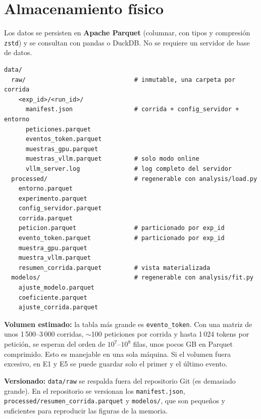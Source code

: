 \documentclass[11pt,a4paper]{article}
\begin{document}
\section{Almacenamiento físico}
Los datos se persisten en \textbf{Apache Parquet} (columnar, con tipos y compresión \texttt{zstd}) y se consultan con pandas o DuckDB. No se requiere un servidor de base de datos.

\begin{center}
\begin{minipage}{0.9\linewidth}
\small
\begin{verbatim}
data/
  raw/                              # inmutable, una carpeta por corrida
    <exp_id>/<run_id>/
      manifest.json                 # corrida + config_servidor + entorno
      peticiones.parquet
      eventos_token.parquet
      muestras_gpu.parquet
      muestras_vllm.parquet         # solo modo online
      vllm_server.log               # log completo del servidor
  processed/                        # regenerable con analysis/load.py
    entorno.parquet
    experimento.parquet
    config_servidor.parquet
    corrida.parquet
    peticion.parquet                # particionado por exp_id
    evento_token.parquet            # particionado por exp_id
    muestra_gpu.parquet
    muestra_vllm.parquet
    resumen_corrida.parquet         # vista materializada
  modelos/                          # regenerable con analysis/fit.py
    ajuste_modelo.parquet
    coeficiente.parquet
    ajuste_corrida.parquet
\end{verbatim}
\end{minipage}
\end{center}

\textbf{Volumen estimado:} la tabla más grande es \texttt{evento_token}. Con una matriz de unos 1\,500–3\,000 corridas, $\sim$100 peticiones por corrida y hasta 1\,024 tokens por petición, se esperan del orden de $10^{7}$–$10^{8}$ filas, unos pocos GB en Parquet comprimido. Esto es manejable en una sola máquina. Si el volumen fuera excesivo, en E1 y E5 se puede guardar solo el primer y el último evento.

\textbf{Versionado:} \texttt{data/raw} se respalda fuera del repositorio Git (es demasiado grande). En el repositorio se versionan los \texttt{manifest.json}, \texttt{processed/resumen_corrida.parquet} y \texttt{modelos/}, que son pequeños y suficientes para reproducir las figuras de la memoria.

\end{document}
